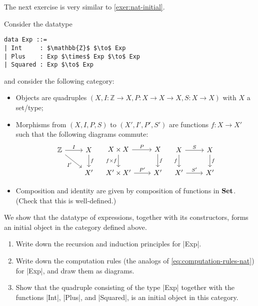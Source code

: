 The next exercise is very similar to \cref{exer:nat-initial}.

\begin{exer}\label{exer:aexp}
  Consider the datatype
\begin{lstlisting}[mathescape=true]
data Exp ::=
| Int     : $\mathbb{Z}$ $\to$ Exp
| Plus    : Exp $\times$ Exp $\to$ Exp
| Squared : Exp $\to$ Exp
\end{lstlisting}
  and consider the following category:
  \begin{itemize}
  \item Objects are quadruples $(X, I : \mathbb{Z} \to X, P : X \to X \to X, S : X \to X)$ with $X$ a set/type;
  \item Morphisms from $(X, I, P, S)$ to $(X', I', P', S')$ are functions
    $f : X \to X'$ such that the following diagrams commute:
    \[
      \begin{tikzcd}
        \mathbb{Z} \ar[r, "I"] \ar[rd, "I'"']
        &
        X \ar[d, "f"]
        \\
        &
        X'
      \end{tikzcd}
      \quad
      \begin{tikzcd}
        X\times X \ar[r, "P"] \ar[d, "f \times f"']
        &
        X \ar[d, "f"]
        \\
        X' \times X' \ar[r, "P'"]
        &
        X'
      \end{tikzcd}
      \quad
      \begin{tikzcd}
        X \ar[r, "S"] \ar[d, "f"']
        &
        X \ar[d, "f"]
        \\
        X' \ar[r, "S'"]
        &
        X'
      \end{tikzcd}
    \]
  \item Composition and identity are given by composition of functions in $\mathbf{Set}$. (Check that this is well-defined.)
  \end{itemize}

We show that the datatype of expressions, together with its constructors, forms an initial object in the category defined above.

\begin{enumerate}
\item Write down the recursion and induction principles for |Exp|.
\item Write down the computation rules (the analogs of \cref{eq:computation-rules-nat}) for |Exp|, and draw them as diagrams.
\item Show that the quadruple consisting of the type |Exp| together with the functions |Int|, |Plus|, and |Squared|, is an initial object in this category. 
\end{enumerate}
  
\end{exer}

